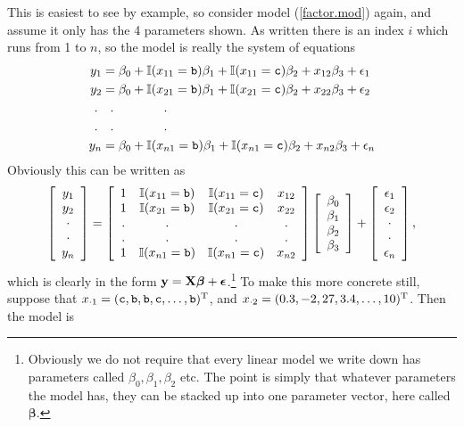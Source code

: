 \documentclass[10pt] {article}
\newcommand{\bp}{{\vm \beta}}
\newcommand{\vm}{\bm} %
\newcommand{\ts}{^{\rm T}}
\newcommand{\bmat}[1]{\left [ \begin{array}{#1}}
\newcommand{\emat}{\end{array}\right ]}
\theoremstyle{definition}
\begin{document}
This is easiest to see by example, so consider model (\ref{factor.mod}) again, and assume it only has the 4 parameters shown. As written there is an index $i$ which runs from 1 to $n$, so the model is really the system of equations
\begin{align*}
y_1 &= \beta_0  + \mathbb{I}(x_{11}={\tt b})\beta_1 + \mathbb{I}(x_{11}={\tt c})\beta_2 + x_{12} \beta_3 + \epsilon_1\\
y_2 &= \beta_0  + \mathbb{I}(x_{21}={\tt b})\beta_1 + \mathbb{I}(x_{21}={\tt c})\beta_2 + x_{22} \beta_3 + \epsilon_2\\
. ~ & ~~.  ~~~~~~~~~~~~ .\\
. ~ & ~~.  ~~~~~~~~~~~~ .\\
y_n &= \beta_0  + \mathbb{I}(x_{n1}={\tt b})\beta_1 + \mathbb{I}(x_{n1}={\tt c})\beta_2 + x_{n2} \beta_3 + \epsilon_n
\end{align*}
Obviously this can be written as 
$$
\bmat{c} y_1 \\ y_2 \\ \cdot \\ \cdot \\ y_n \emat = 
\bmat{cccc}
1 & \mathbb{I}(x_{11}={\tt b}) &  \mathbb{I}(x_{11}={\tt c}) & x_{12} \\
1 & \mathbb{I}(x_{21}={\tt b}) &  \mathbb{I}(x_{21}={\tt c}) & x_{22} \\
. & . & . & . \\. & . & . & . \\
1 & \mathbb{I}(x_{n1}={\tt b}) &  \mathbb{I}(x_{n1}={\tt c}) & x_{n2}
\emat \bmat{c} \beta_0 \\ \beta_1 \\ \beta_2 \\ \beta_3 \emat + 
\bmat{c} \epsilon_1 \\ \epsilon_2 \\ \cdot \\ \cdot \\ \epsilon_n \emat,
$$
which is clearly in the form $ {\bf y} = {\bf X}{\bm \beta} + {\bm \epsilon} $.\footnote{Obviously we do not require that every linear model we write down has parameters called $\beta_0,\beta_1,\beta_2$ etc. The point is simply that  whatever parameters the model has, they can be stacked up into one parameter vector, here called $\bp$. } To make this more concrete still, suppose that $x_{\cdot1} = ({\tt c},{\tt b},{\tt b},{\tt c}, \ldots, {\tt b})\ts$, and $x_{\cdot2} = (0.3,-2,27,3.4, \ldots, 10 )\ts $. Then the model is 
\end{document}

